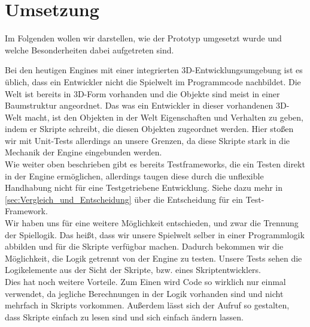 \chapter{Umsetzung}
Im Folgenden wollen wir darstellen, wie der Prototyp umgesetzt wurde und welche Besonderheiten dabei aufgetreten sind.

Bei den heutigen Engines mit einer integrierten 3D-Entwicklungsumgebung ist es üblich, dass ein Entwickler nicht die Spielwelt im Programmcode nachbildet. Die Welt ist bereits in 3D-Form vorhanden und die Objekte sind meist in einer Baumstruktur angeordnet. Das was ein Entwickler in dieser vorhandenen 3D-Welt macht, ist den Objekten in der Welt Eigenschaften und Verhalten zu geben, indem er Skripte schreibt, die diesen Objekten zugeordnet werden. Hier stoßen wir mit Unit-Tests allerdings an unsere Grenzen, da diese Skripte stark in die Mechanik der Engine eingebunden werden.\\
Wie weiter oben beschrieben gibt es bereits Testframeworks, die ein Testen direkt in der Engine ermöglichen, allerdings taugen diese durch die unflexible Handhabung nicht für eine Testgetriebene Entwicklung. Siehe dazu mehr in \autoref{sec:Vergleich_und_Entscheidung} über die Entscheidung für ein Test-Framework.\\
Wir haben uns für eine weitere Möglichkeit entschieden, und zwar die Trennung der Spiellogik. Das heißt, dass wir unsere Spielwelt selber in einer Programmlogik abbilden und für die Skripte verfügbar machen. Dadurch bekommen wir die Möglichkeit, die Logik getrennt von der Engine zu testen. Unsere Tests sehen die Logikelemente aus der Sicht der Skripte, bzw. eines Skriptentwicklers.\\
Dies hat noch weitere Vorteile. Zum Einen wird Code so wirklich nur einmal verwendet, da jegliche Berechnungen in der Logik vorhanden sind und nicht mehrfach in Skripts vorkommen. Außerdem lässt sich der Aufruf so gestalten, dass Skripte einfach zu lesen sind und sich einfach ändern lassen.
\pagebreak

